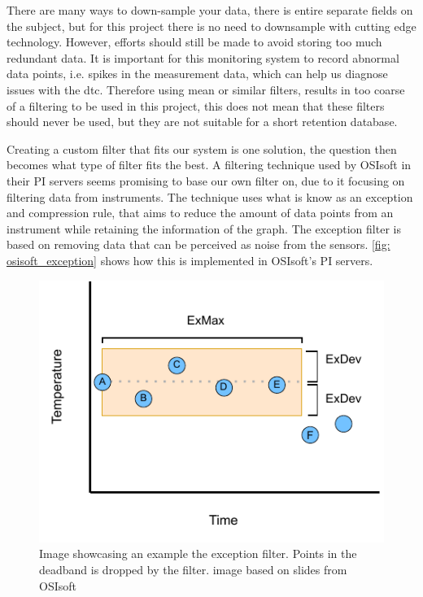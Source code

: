 \documentclass[main.tex]{subfiles}
\begin{document}
 There are many ways to down-sample your data, there is entire separate fields on the subject, but for this project there is no need to downsample with cutting edge technology. However, efforts should still be made to avoid storing too much redundant data. It is important for this monitoring system to record abnormal data points, i.e. spikes in the measurement data, which can help us diagnose issues with the \gls{dtc}. Therefore using mean or similar filters, results in too coarse of a filtering to be used in this project, this does not mean that these filters should never be used, but they are not suitable for a short retention database.
 
 Creating a custom filter that fits our system is one solution, the question then becomes what type of filter fits the best. A filtering technique used by OSIsoft in their PI servers seems promising to base our own filter on, due to it focusing on filtering data from instruments\cite{osisoft_exception}. The technique uses what is know as an exception and compression rule, that aims to reduce the amount of data points from an instrument while retaining the information of the graph. The exception filter is based on removing data that can be perceived as noise from the sensors. \autoref{fig: osisoft_exception} shows how this is implemented in OSIsoft's PI servers.
 
\begin{figure}[!ht]
    \centering
    \includegraphics[scale=1.3]{images/exception_process.pdf}
    \caption{Image showcasing an example the exception filter. Points in the deadband is dropped by the filter. image based on slides from OSIsoft\cite{osisoft_image}}
    \label{fig: osisoft_exception}
\end{figure}
\FloatBarrier 
 
\end{document}
